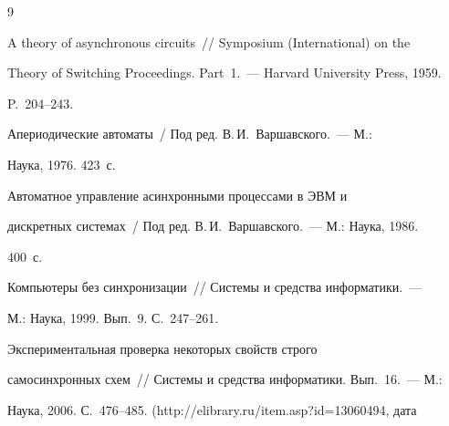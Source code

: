 {\small\frenchspacing


{%




\begin{thebibliography}{9}


      






      A theory of asynchronous circuits~/\!\!/  Symposium (International) on the 


Theory  of Switching Proceedings. Part~1.~--- Harvard University Press, 1959. 


P.~204--243.


      




      Апериодические автоматы~/ Под ред. В.\,И.~Варшавского.~--- М.: 


Наука, 1976.  423~с.


      




      Автоматное управление асинхронными процессами в ЭВМ и 


дискретных системах~/ Под ред. В.\,И.~Варшавского.~--- М.: Наука, 1986. 


400~с.


      






      Компьютеры без синхронизации~/\!\!/ Системы и средства информатики.~--- 


      М.: Наука, 1999. Вып.~9. С.~247--261.


      






      Экспериментальная проверка некоторых свойств строго 


самосинхронных схем~/\!\!/ Системы и средства информатики. Вып.~16.~--- М.: 


Наука, 2006. С.~476--485. ({\sf http://elibrary.ru/item.asp?id=13060494}, дата 



\end{thebibliography}}}
